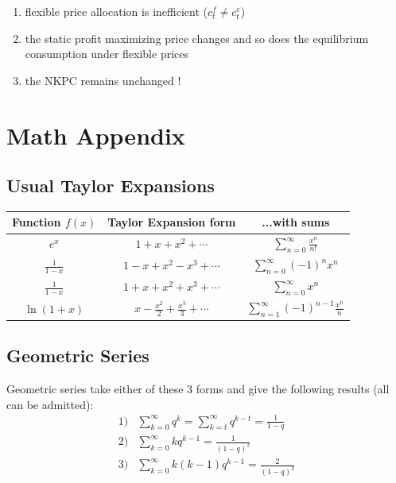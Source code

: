 \documentclass{article}
\begin{document}
\begin{shortbox}
    \begin{enumerate}
        \item flexible price allocation is inefficient ($c_t^f \neq c_t^e$)
        \item the static profit maximizing price changes and so does the equilibrium consumption under flexible prices
        \item the NKPC remains unchanged ! 
    \end{enumerate}
\end{shortbox}



\section{Math Appendix}
\subsection{Usual Taylor Expansions}
\begin{tabular}{c|c|c}
\toprule
Function $f(x)$ & Taylor Expansion form & ...with sums \\ 
\midrule 
$e^x$ & $1 + x + x^2 + \cdots$ & $\sum_{n=0}^\infty\frac{x^n}{n!}$ \\ 
\midrule
$\frac{1}{1-x}$ & $1 - x + x^2 - x^3 + \cdots$ & $\sum_{n=0}^\infty (-1)^nx^n$ \\ 
\midrule
$\frac{1}{1-x}$ & $1 + x + x^2 + x^3 + \cdots$ & $\sum_{n=0}^\infty x^n$ \\ 
\midrule
$\ln(1+x)$ & $x - \frac{x^2}{2} + \frac{x^3}{3} + \cdots$ & $\sum_{n=1}^\infty(-1)^{n-1}\frac{x^n}{n}$ \\ 
\bottomrule
\end{tabular}
\subsection{Geometric Series}
Geometric series take either of these 3 forms and give the following results (all can be admitted): 
\begin{equation}
\begin{aligned}
    1)& \sum_{k=0}^\infty q^k = \sum_{k=t}^\infty q^{k-t} = \frac{1}{1-q} \\
    2)& \sum_{k=0}^\infty kq^{k-1} = \frac{1}{(1-q)^2} \\
    3)& \sum_{k=0}^\infty k(k-1)q^{k-1} = \frac{2}{(1-q)^3}
\end{aligned}
\end{equation}
\end{document}
